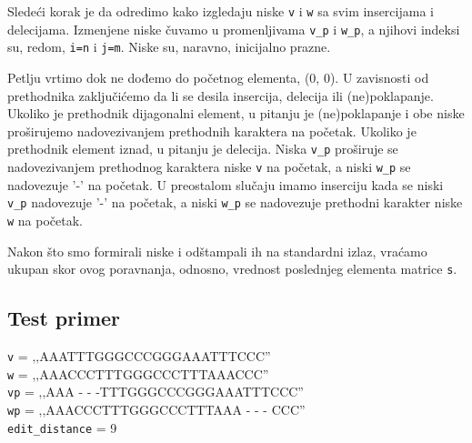 Sledeći korak je da odredimo kako izgledaju niske \texttt{v} i \texttt{w} sa svim insercijama i delecijama. Izmenjene niske čuvamo u promenljivama \texttt{v\_p} i \texttt{w\_p}, a njihovi indeksi su, redom, \texttt{i=n} i \texttt{j=m}. Niske su, naravno, inicijalno prazne.

Petlju vrtimo dok ne dođemo do početnog elementa, (0, 0). U zavisnosti od prethodnika zaključićemo da li se desila insercija, delecija ili (ne)poklapanje. Ukoliko je prethodnik dijagonalni element, u pitanju je (ne)poklapanje i obe niske proširujemo nadovezivanjem prethodnih karaktera na početak. Ukoliko je prethodnik element iznad, u pitanju je delecija. Niska \texttt{v\_p} proširuje se nadovezivanjem prethodnog karaktera niske \texttt{v} na početak, a niski \texttt{w\_p} se nadovezuje '-' na početak. U preostalom slučaju imamo inserciju kada se niski \texttt{v\_p} nadovezuje '-' na početak, a niski \texttt{w\_p} se nadovezuje prethodni karakter niske \texttt{w} na početak.

Nakon što smo formirali niske i odštampali ih na standardni izlaz, vraćamo ukupan skor ovog poravnanja, odnosno, vrednost poslednjeg elementa matrice \texttt{s}.


\subsection{Test primer}

\noindent\texttt{v} = ‚‚AAATTTGGGCCCGGGAAATTTCCC''
\\\texttt{w} = ‚‚AAACCCTTTGGGCCCTTTAAACCC''
\\\texttt{vp} = ‚‚AAA - - -TTTGGGCCCGGGAAATTTCCC''
\\\texttt{wp} = ‚‚AAACCCTTTGGGCCCTTTAAA - - - CCC''
\\\texttt{edit\_distance} = 9


\newpage
